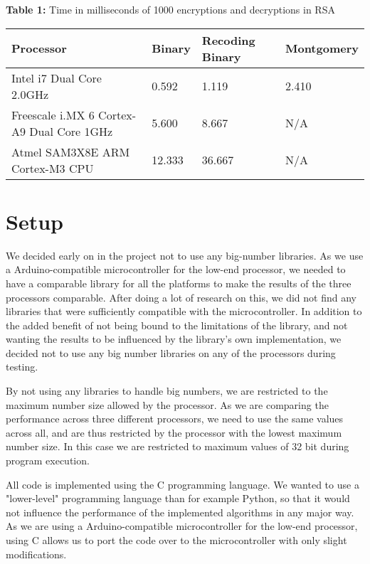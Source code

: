 \documentclass[twocolumn]{IEEEtran}
\begin{document}
\begin{table*}[!htb] 
\textbf{Table 1:} Time in milliseconds of 1000 encryptions and decryptions in RSA \\[1em]
    \centering
    \begin{tabular}{|l|l|l|l|}
    \hline
    {\bf Processor}                                 & {\bf Binary}   & {\bf Recoding Binary} & {\bf Montgomery} \\ \hline
    Intel i7 Dual Core 2.0GHz                 & 0.592 & 1.119        & 2.410   \\ \hline
    Freescale i.MX 6 Cortex-A9 Dual Core 1GHz & 5.600 & 8.667        & N/A       \\ \hline
    Atmel SAM3X8E ARM Cortex-M3 CPU           & 12.333 & 36.667        & N/A       \\ \hline
    \end{tabular}
\end{table*}

\section{Setup}
We decided early on in the project not to use any big-number libraries. As we use a Arduino-compatible microcontroller for the low-end processor, we needed to have a comparable library for all the platforms to make the results of the three processors comparable. After doing a lot of research on this, we did not find any libraries that were sufficiently compatible with the microcontroller. In addition to the added benefit of not being bound to the limitations of the library, and not wanting the results to be influenced by the library's own implementation, we decided not to use any big number libraries on any of the processors during testing.

By not using any libraries to handle big numbers, we are restricted to the maximum number size allowed by the processor. As we are comparing the performance across three different processors, we need to use the same values across all, and are thus restricted by the processor with the lowest maximum number size. In this case we are restricted to maximum values of 32 bit during program execution.

All code is implemented using the C programming language.  We wanted to use a "lower-level" programming language than for example Python, so that it would not influence the performance of the implemented algorithms in any major way. As we are using a Arduino-compatible microcontroller for the low-end processor, using C allows us to port the code over to the microcontroller with only slight modifications.
\end{document}
